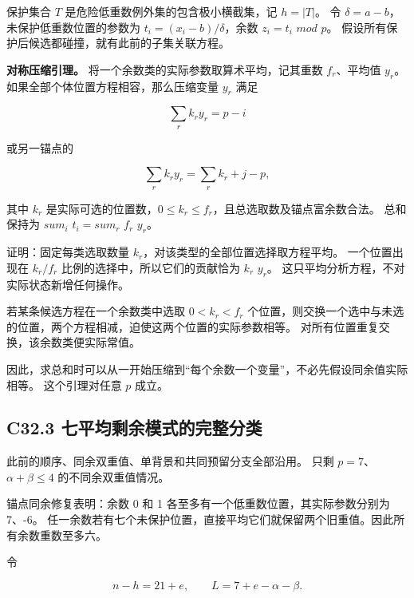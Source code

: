 \documentclass[11pt,a4paper]{article}
\theoremstyle{definition}
\numberwithin{equation}{section}
\begin{document}
{保护集合} {\ensuremath{T}} {是危险低重数例外集的包含极小横截集，记} {\ensuremath{h=|T|}。} {令} {\ensuremath{\delta =a-b}，未保护低重数位置的参数为} {\ensuremath{t_{i}=(x_{i}-b)/\delta }，余数} {\ensuremath{z_{i}=t_{i}}} {\ensuremath{mod}} {\ensuremath{p}。} {假设所有保护后候选都碰撞，就有此前的子集关联方程。}

\textbf{{对称压缩引理。}} {将一个余数类的实际参数取算术平均，记其重数} {\ensuremath{f_{r}}、平均值} {\ensuremath{y_{r}}。} {如果全部个体位置方程相容，那么压缩变量} {\ensuremath{y_{r}}} {满足}

\[
\sum_r k_r y_r=p-i
\]

{或另一锚点的}

\[
\sum_r k_r y_r=\sum_r k_r+j-p,
\]

{其中} {\ensuremath{k_{r}}} {是实际可选的位置数，\ensuremath{0\le k_{r}\le f_{r}}，且总选取数及锚点富余数合法。} {总和保持为} {\ensuremath{sum_{i}}} {\ensuremath{t_{i}=sum_{r}}} {\ensuremath{f_{r}}} {\ensuremath{y_{r}}。}

{证明：固定每类选取数量} {\ensuremath{k_{r}}，对该类型的全部位置选择取方程平均。} {一个位置出现在} {\ensuremath{k_{r}/f_{r}}} {比例的选择中，所以它们的贡献恰为} {\ensuremath{k_{r}}} {\ensuremath{y_{r}}。} {这只平均分析方程，不对实际状态新增任何操作。}

{若某条候选方程在一个余数类中选取} {\ensuremath{0<k_{r}<f_{r}}} {个位置，则交换一个选中与未选的位置，两个方程相减，迫使这两个位置的实际参数相等。} {对所有位置重复交换，该余数类便实际常值。}

{因此，求总和时可以从一开始压缩到``每个余数一个变量''，不必先假设同余值实际相等。} {这个引理对任意} {\ensuremath{p}} {成立。}

\subsection*{\texorpdfstring{{C32.3} {七平均剩余模式的完整分类}}{C32.3 七平均剩余模式的完整分类}}\label{C32-h209}

{此前的顺序、同余双重值、单背景和共同预留分支全部沿用。} {只剩} {\ensuremath{p=7}、\ensuremath{\alpha +\beta \le 4}} {的不同余双重值情况。}

{锚点同余修复表明：余数} {0} {和} {1} {各至多有一个低重数位置，其实际参数分别为} {7、-6。} {任一余数若有七个未保护位置，直接平均它们就保留两个旧重值。因此所有余数重数至多六。}

{令}

\[
n-h=21+e,\qquad L=7+e-\alpha-\beta.
\]
\end{document}
